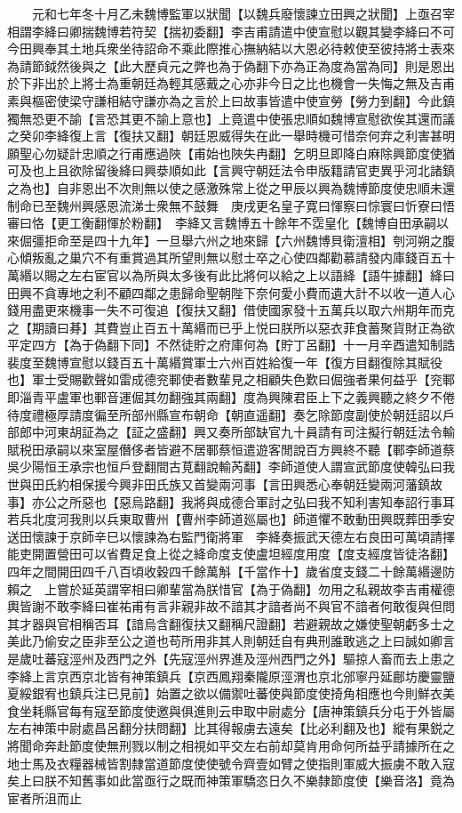 　　元和七年冬十月乙未魏博監軍以狀聞【以魏兵廢懷諫立田興之狀聞】上亟召宰相謂李絳曰卿揣魏博若符契【揣初委翻】李吉甫請遣中使宣慰以觀其變李絳曰不可今田興奉其土地兵衆坐待詔命不乘此際推心撫納結以大恩必待敕使至彼持將士表來為請節鉞然後與之【此大歷貞元之弊也為于偽翻下亦為正為度為當為同】則是恩出於下非出於上將士為重朝廷為輕其感戴之心亦非今日之比也機會一失悔之無及吉甫素與樞密使梁守謙相結守謙亦為之言於上曰故事皆遣中使宣勞【勞力到翻】今此鎮獨無恐更不諭【言恐其更不諭上意也】上竟遣中使張忠順如魏博宣慰欲俟其還而議之癸卯李絳復上言【復扶又翻】朝廷恩威得失在此一舉時機可惜奈何弃之利害甚明願聖心勿疑計忠順之行甫應過陜【甫始也陜失冉翻】乞明旦即降白麻除興節度使猶可及也上且欲除留後絳曰興㳟順如此【言興守朝廷法令申版籍請官吏異乎河北諸鎮之為也】自非恩出不次則無以使之感激殊常上從之甲辰以興為魏博節度使忠順未還制命已至魏州興感恩流涕士衆無不鼓舞　庚戌更名皇子寛曰惲察曰悰寰曰忻寮曰悟審曰恪【更工衡翻惲於粉翻】　李絳又言魏博五十餘年不霑皇化【魏博自田承嗣以來倔彊拒命至是四十九年】一旦舉六州之地來歸【六州魏博貝衛澶相】刳河朔之腹心傾叛亂之巢穴不有重賞過其所望則無以慰士卒之心使四鄰勸慕請發内庫錢百五十萬緡以賜之左右宦官以為所與太多後有此比將何以給之上以語絳【語牛據翻】絳曰田興不貪專地之利不顧四鄰之患歸命聖朝陛下奈何愛小費而遺大計不以收一道人心錢用盡更來機事一失不可復追【復扶又翻】借使國家發十五萬兵以取六州期年而克之【期讀曰朞】其費豈止百五十萬緡而已乎上悦曰朕所以惡衣菲食蓄聚貨財正為欲平定四方【為于偽翻下同】不然徒貯之府庫何為【貯丁呂翻】十一月辛酉遣知制誥裴度至魏博宣慰以錢百五十萬緡賞軍士六州百姓給復一年【復方目翻復除其賦役也】軍士受賜歡聲如雷成德兖鄆使者數輩見之相顧失色歎曰倔強者果何益乎【兖鄆即淄青平盧軍也鄆音運倔其勿翻強其兩翻】度為興陳君臣上下之義興聽之終夕不倦待度禮極厚請度徧至所部州縣宣布朝命【朝直遥翻】奏乞除節度副使於朝廷詔以戶部郎中河東胡証為之【証之盛翻】興又奏所部缺官九十員請有司注擬行朝廷法令輸賦税田承嗣以來室屋僭侈者皆避不居鄆蔡恒遣遊客閒說百方興終不聽【鄆李師道蔡吳少陽恒王承宗也恒戶登翻間古莧翻說輸芮翻】李師道使人謂宣武節度使韓弘曰我世與田氏約相保援今興非田氏族又首變兩河事【言田興悉心奉朝廷變兩河藩鎮故事】亦公之所惡也【惡烏路翻】我將與成德合軍討之弘曰我不知利害知奉詔行事耳若兵北度河我則以兵東取曹州【曹州李師道廵屬也】師道懼不敢動田興既葬田季安送田懷諫于京師辛巳以懷諫為右監門衛將軍　李絳奏振武天德左右良田可萬頃請擇能吏開置營田可以省費足食上從之絳命度支使盧坦經度用度【度支經度皆徒洛翻】四年之間開田四千八百頃收穀四千餘萬斛【千當作十】歲省度支錢二十餘萬緡邊防賴之　上嘗於延英謂宰相曰卿輩當為朕惜官【為于偽翻】勿用之私親故李吉甫權德輿皆謝不敢李絳曰崔祐甫有言非親非故不諳其才諳者尚不與官不諳者何敢復與但問其才器與官相稱否耳【諳烏含翻復扶又翻稱尺證翻】若避親故之嫌使聖朝虧多士之美此乃偷安之臣非至公之道也苟所用非其人則朝廷自有典刑誰敢逃之上曰誠如卿言　是歲吐蕃寇涇州及西門之外【先寇涇州界進及涇州西門之外】驅掠人畜而去上患之李絳上言京西京北皆有神策鎮兵【京西鳳翔秦隴原涇渭也京北邠寧丹延鄜坊慶靈鹽夏綏銀宥也鎮兵注已見前】始置之欲以備禦吐蕃使與節度使掎角相應也今則鮮衣美食坐耗縣官每有寇至節度使邀與俱進則云申取中尉處分【唐神策鎮兵分屯于外皆屬左右神策中尉處昌呂翻分扶問翻】比其得報虜去遠矣【比必利翻及也】縱有果鋭之將聞命奔赴節度使無刑戮以制之相視如平交左右前却莫肯用命何所益乎請據所在之地士馬及衣糧器械皆割隸當道節度使使號令齊壹如臂之使指則軍威大振虜不敢入寇矣上曰朕不知舊事如此當亟行之既而神策軍驕恣日久不樂隸節度使【樂音洛】竟為宦者所沮而止

